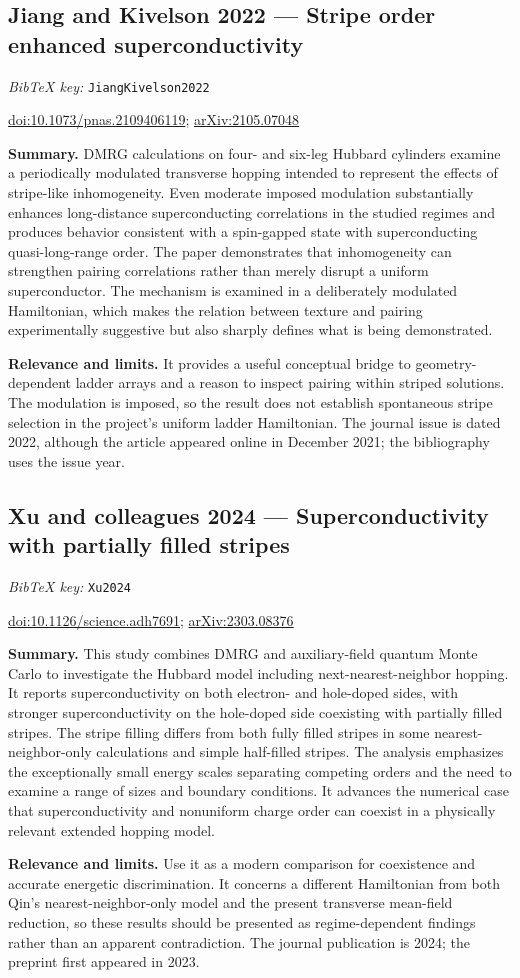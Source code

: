 \documentclass[11pt]{article}
\newcommand{\paper}[2]{\Needspace{8\baselineskip}\subsection{#2}\label{paper:#1}\textit{BibTeX key:} \texttt{#1}\quad\citep{#1}\par}
\newcommand{\doi}[1]{\href{https://doi.org/#1}{doi:#1}}
\newcommand{\arxiv}[1]{\href{https://arxiv.org/abs/#1}{arXiv:#1}}
\newcommand{\summary}{\par\textbf{Summary.} }
\newcommand{\relevance}{\par\textbf{Relevance and limits.} }
\begin{document}
\paper{JiangKivelson2022}{Jiang and Kivelson 2022 --- Stripe order enhanced superconductivity}
\doi{10.1073/pnas.2109406119}; \arxiv{2105.07048}
\summary DMRG calculations on four- and six-leg Hubbard cylinders examine a periodically modulated transverse hopping intended to represent the effects of stripe-like inhomogeneity. Even moderate imposed modulation substantially enhances long-distance superconducting correlations in the studied regimes and produces behavior consistent with a spin-gapped state with superconducting quasi-long-range order. The paper demonstrates that inhomogeneity can strengthen pairing correlations rather than merely disrupt a uniform superconductor. The mechanism is examined in a deliberately modulated Hamiltonian, which makes the relation between texture and pairing experimentally suggestive but also sharply defines what is being demonstrated.
\relevance It provides a useful conceptual bridge to geometry-dependent ladder arrays and a reason to inspect pairing within striped solutions. The modulation is imposed, so the result does not establish spontaneous stripe selection in the project's uniform ladder Hamiltonian. The journal issue is dated 2022, although the article appeared online in December 2021; the bibliography uses the issue year.

\paper{Xu2024}{Xu and colleagues 2024 --- Superconductivity with partially filled stripes}
\doi{10.1126/science.adh7691}; \arxiv{2303.08376}
\summary This study combines DMRG and auxiliary-field quantum Monte Carlo to investigate the Hubbard model including next-nearest-neighbor hopping. It reports superconductivity on both electron- and hole-doped sides, with stronger superconductivity on the hole-doped side coexisting with partially filled stripes. The stripe filling differs from both fully filled stripes in some nearest-neighbor-only calculations and simple half-filled stripes. The analysis emphasizes the exceptionally small energy scales separating competing orders and the need to examine a range of sizes and boundary conditions. It advances the numerical case that superconductivity and nonuniform charge order can coexist in a physically relevant extended hopping model.
\relevance Use it as a modern comparison for coexistence and accurate energetic discrimination. It concerns a different Hamiltonian from both Qin's nearest-neighbor-only model and the present transverse mean-field reduction, so these results should be presented as regime-dependent findings rather than an apparent contradiction. The journal publication is 2024; the preprint first appeared in 2023.
\end{document}
